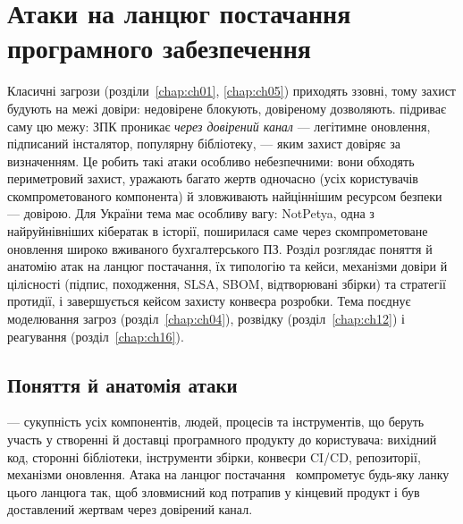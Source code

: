 \chapter{Атаки на ланцюг постачання програмного забезпечення}
\label{chap:ch15}

Класичні загрози (розділи~\ref{chap:ch01}, \ref{chap:ch05}) приходять ззовні, тому захист будують на межі довіри: недовірене блокують, довіреному дозволяють.  підриває саму цю межу: ЗПК проникає \emph{через довірений канал} --- легітимне оновлення, підписаний інсталятор, популярну бібліотеку, --- яким захист довіряє за визначенням. Це робить такі атаки особливо небезпечними: вони обходять периметровий захист, уражають багато жертв одночасно (усіх користувачів скомпрометованого компонента) й зловживають найціннішим ресурсом безпеки --- довірою. Для України тема має особливу вагу: NotPetya, одна з найруйнівніших кібератак в історії, поширилася саме через скомпрометоване оновлення широко вживаного бухгалтерського ПЗ. Розділ розглядає поняття й анатомію атак на ланцюг постачання, їх типологію та кейси, механізми довіри й цілісності (підпис, походження, SLSA, SBOM, відтворювані збірки) та стратегії протидії, і завершується кейсом захисту конвеєра розробки. Тема поєднує моделювання загроз (розділ~\ref{chap:ch04}), розвідку (розділ~\ref{chap:ch12}) і реагування (розділ~\ref{chap:ch16}).

\section{Поняття й анатомія атаки}\label{sec:ch15-concept}

 --- сукупність усіх компонентів, людей, процесів та інструментів, що беруть участь у створенні й доставці програмного продукту до користувача: вихідний код, сторонні бібліотеки, інструменти збірки, конвеєри CI/CD, репозиторії, механізми оновлення. Атака на ланцюг постачання~\cite{ch15:enisa} компрометує будь-яку ланку цього ланцюга так, щоб зловмисний код потрапив у кінцевий продукт і був доставлений жертвам через довірений канал.

\begin{tikzfig}
\end{tikzfig}

